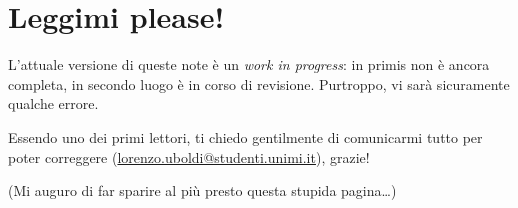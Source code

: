 \chapter{Leggimi please!}
L'attuale versione di queste note è un \emph{work in progress}: in primis non è ancora completa, in secondo luogo è in corso di revisione. Purtroppo, vi sarà sicuramente qualche errore. 

Essendo uno dei primi lettori, ti chiedo gentilmente di comunicarmi tutto per poter correggere (\href{mailto:lorenzo.uboldi@studenti.unimi.it}{\ttfamily lorenzo.uboldi@studenti.unimi.it}), grazie!

(Mi auguro di far sparire al più presto questa stupida pagina\ldots)